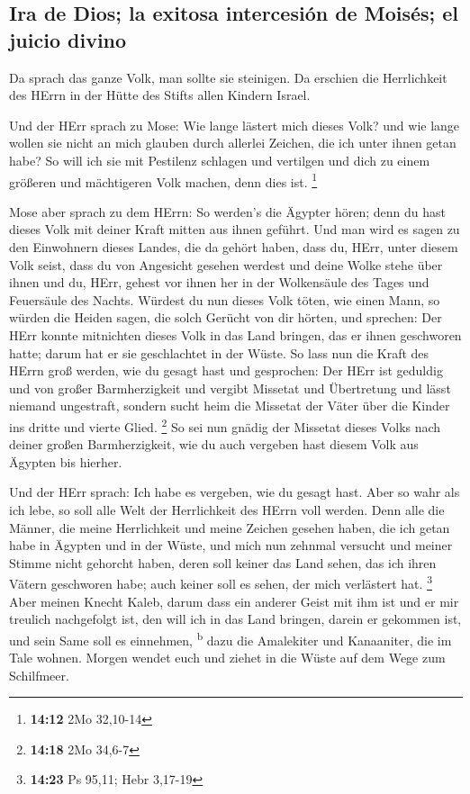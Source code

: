 \hypertarget{ira-de-dios-la-exitosa-intercesiuxf3n-de-moisuxe9s-el-juicio-divino}{%
\subsection{Ira de Dios; la exitosa intercesión de Moisés; el juicio
divino}\label{ira-de-dios-la-exitosa-intercesiuxf3n-de-moisuxe9s-el-juicio-divino}}

 Da sprach das ganze Volk, man sollte sie steinigen. Da
erschien die Herrlichkeit des HErrn in der Hütte des Stifts allen
Kindern Israel.

 Und der HErr sprach zu Mose: Wie lange lästert mich
dieses Volk? und wie lange wollen sie nicht an mich glauben durch
allerlei Zeichen, die ich unter ihnen getan habe?  So
will ich sie mit Pestilenz schlagen und vertilgen und dich zu einem
größeren und mächtigeren Volk machen, denn dies ist. \footnote{\textbf{14:12}
  2Mo 32,10-14}

 Mose aber sprach zu dem HErrn: So werden's die Ägypter
hören; denn du hast dieses Volk mit deiner Kraft mitten aus ihnen
geführt.  Und man wird es sagen zu den Einwohnern dieses
Landes, die da gehört haben, dass du, HErr, unter diesem Volk seist,
dass du von Angesicht gesehen werdest und deine Wolke stehe über ihnen
und du, HErr, gehest vor ihnen her in der Wolkensäule des Tages und
Feuersäule des Nachts.  Würdest du nun dieses Volk töten,
wie einen Mann, so würden die Heiden sagen, die solch Gerücht von dir
hörten, und sprechen:  Der HErr konnte mitnichten dieses
Volk in das Land bringen, das er ihnen geschworen hatte; darum hat er
sie geschlachtet in der Wüste.  So lass nun die Kraft des
HErrn groß werden, wie du gesagt hast und gesprochen: 
Der HErr ist geduldig und von großer Barmherzigkeit und vergibt Missetat
und Übertretung und lässt niemand ungestraft, sondern sucht heim die
Missetat der Väter über die Kinder ins dritte und vierte Glied.
\footnote{\textbf{14:18} 2Mo 34,6-7}  So sei nun gnädig
der Missetat dieses Volks nach deiner großen Barmherzigkeit, wie du auch
vergeben hast diesem Volk aus Ägypten bis hierher.

 Und der HErr sprach: Ich habe es vergeben, wie du gesagt
hast.  Aber so wahr als ich lebe, so soll alle Welt der
Herrlichkeit des HErrn voll werden.  Denn alle die
Männer, die meine Herrlichkeit und meine Zeichen gesehen haben, die ich
getan habe in Ägypten und in der Wüste, und mich nun zehnmal versucht
und meiner Stimme nicht gehorcht haben,  deren soll
keiner das Land sehen, das ich ihren Vätern geschworen habe; auch keiner
soll es sehen, der mich verlästert hat. \footnote{\textbf{14:23} Ps
  95,11; Hebr 3,17-19}  Aber meinen Knecht Kaleb, darum
dass ein anderer Geist mit ihm ist und er mir treulich nachgefolgt ist,
den will ich in das Land bringen, darein er gekommen ist, und sein Same
soll es einnehmen, \textsuperscript{b}  dazu die
Amalekiter und Kanaaniter, die im Tale wohnen. Morgen wendet euch und
ziehet in die Wüste auf dem Wege zum Schilfmeer.

